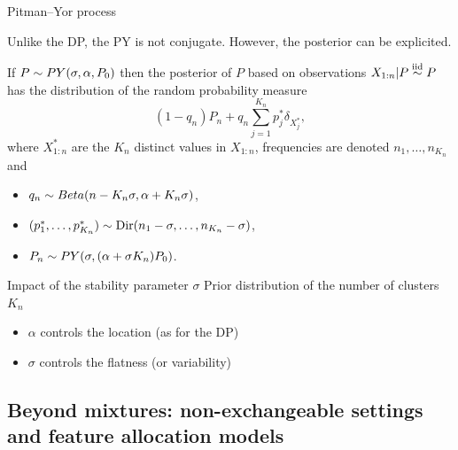 \begin{frame}[allowframebreaks]{Pitman--Yor process}
\framebreak

Unlike the DP, the \alert{PY is not conjugate}. However, the posterior can be explicited.

\begin{theorem}
 If $P\sim PY(\sigma, \alpha, P_0)$ then the posterior of $P$ based on observations $X_{1:n}|P\stackrel{\mbox{\scriptsize{iid}}}{\sim} P$ has the distribution of the random probability measure
\begin{equation*}
    (1-q_n)P_n + q_n \sum_{j=1}^{K_n}p_j^*\delta_{X_j^*},
\end{equation*}
where $X^*_{1:n}$ are the $K_n$ distinct values in $X_{1:n}$, frequencies are denoted $n_1,\ldots,n_{K_n}$ and 
\begin{itemize}
    \item $q_n\sim Beta(n-K_n \sigma, \alpha +K_n\sigma)$,
    \item $(p_1^*, \ldots, p^*_{K_n})\sim \text{Dir}(n_1-\sigma, \ldots, n_{K_n} -\sigma)$,
    \item $P_n\sim PY(\sigma, (\alpha + \sigma K_n)P_0)$.
\end{itemize}
\end{theorem} 
\end{frame}

\begin{frame}{Impact of the stability parameter $\sigma$}
Prior distribution of the number of clusters $K_n$ 
\begin{itemize}
\item<1-> \textcolor<1>{red2}{$\alpha$ controls the location} (as for the DP)
\item<2-> \textcolor<2>{red2}{$\sigma$ controls the flatness (or variability)}
\end{itemize}
\begin{center}
\end{center}
\end{frame}

\subsection{Beyond mixtures: non-exchangeable settings and feature allocation models}



